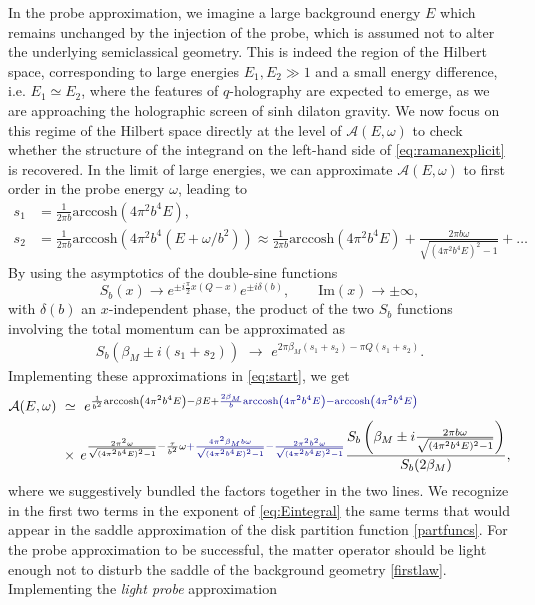 \documentclass[a4paper,titlepage,12pt]{article}
\numberwithin{equation}{section}
\begin{document}
In the probe approximation, we imagine a large background energy $E$ which remains unchanged by the injection of the probe, which is assumed not to alter the underlying semiclassical geometry. This is indeed the region of the Hilbert space, corresponding to large energies $E_1,E_2 \gg1$ and a small energy difference, i.e. $E_1\simeq E_2$, where the features of $q$-holography are expected to emerge, as we are approaching the holographic screen of sinh dilaton gravity. We now focus on this regime of the Hilbert space directly at the level of $\mathcal{A}(E,\omega)$ to check whether the structure of the integrand on the left-hand side of \eqref{eq:ramanexplicit} is recovered. In the limit of large energies, we can approximate $\mathcal{A}(E,\omega)$  to first order in the probe energy $\omega$, leading to 
\begin{align}
        s_1&=\frac{1}{2\pi b}\text{arccosh}(4\pi^2 b^4E), \\
        s_2&=\frac{1}{2\pi b}\text{arccosh}\left(4\pi^2b^4 (E+\omega/b^2)\right) \approx \frac{1}{2\pi b}\text{arccosh}(4\pi^2b^4 E)+\frac{2\pi b\omega}{\sqrt{(4\pi^2b^4E)^2-1}}+\dots \nonumber
\end{align} 
By using the asymptotics of the double-sine functions  
\begin{equation}
S_b(x) \to e^{\pm i \frac{\pi}{2}x(Q-x)}e^{\pm i \delta(b)}, \qquad \text{Im}(x) \to \pm \infty,
\end{equation}
with $\delta(b)$ an $x$-independent phase, the product of the two $S_b$ functions involving the total momentum can be approximated as 
\begin{align}
    S_b(\beta_M\pm i(s_1+s_2)) \,\, \rightarrow \,\,e^{2\pi \beta_M(s_1+s_2)-\pi Q (s_1+s_2)}.
\end{align}
Implementing these approximations in \eqref{eq:start}, we get 
\begin{align}
\mathcal{A}(E,\omega) \,\,&\simeq \,\, e^{\frac{1}{b^2} \text{arccosh}\left(4\pi^2b^4 E\right)- \beta E+{\color{darkblue}\frac{2\beta_M}{b}\text{arccosh}\left(4\pi^2b^4E\right)-\text{arccosh}\left(4\pi^2b^4E\right)}} \label{eq:Eintegral}\\
&\times \,e^{\frac{2\pi^2\omega}{\sqrt{(4\pi^2b^4E)^2-1}}-\frac{\tau}{b^2}\omega{\color{darkblue}+\frac{4\pi^2\beta_M b\omega}{\sqrt{(4\pi^2b^4E)^2-1}}-\frac{2\pi^2b^2\omega}{\sqrt{(4\pi^2b^4E)^2-1}}}}\frac{S_b\left(\beta_M\pm i \frac{2\pi b\omega}{\sqrt{(4\pi^2b^4E)^2-1}}\right)}{S_b(2\beta_M)} ,\label{eq:omegaintegral}
\end{align}
where we suggestively bundled the factors together in the two lines. We recognize in the first two terms in the exponent of \eqref{eq:Eintegral} the same terms that would appear in the saddle approximation of the disk partition function \eqref{partfuncs}. For the probe approximation to be successful, the matter operator should be light enough not to disturb the saddle of the background geometry \eqref{firstlaw}. Implementing the \emph{light probe} approximation 
\end{document}
